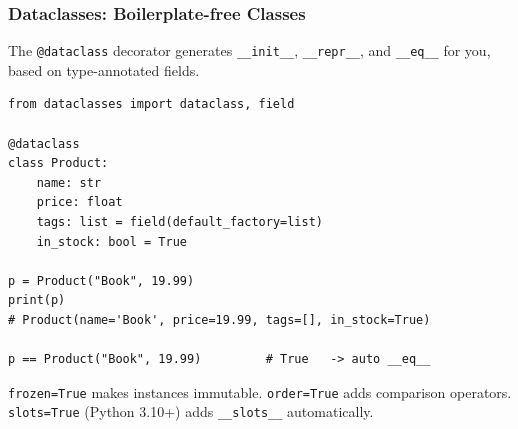 \documentclass[aspectratio=169,10pt]{beamer}
\newcommand{\codeword}[1]{\texttt{#1}}
\newenvironment{bluebox}[1]{%
  \vspace{0.08cm}\begin{tcolorbox}[lecturebox,title={#1},fontupper=\small]%
}{\end{tcolorbox}\vspace{0.05cm}}
\begin{document}
\begin{frame}[fragile]
\frametitle{Dataclasses: Boilerplate-free Classes}
\small
The \codeword{@dataclass} decorator generates \codeword{\_\_init\_\_}, \codeword{\_\_repr\_\_}, and \codeword{\_\_eq\_\_} for you, based on type-annotated fields.

\vspace{0.12cm}
\begin{lstlisting}[style=pycode]
from dataclasses import dataclass, field

@dataclass
class Product:
    name: str
    price: float
    tags: list = field(default_factory=list)
    in_stock: bool = True

p = Product("Book", 19.99)
print(p)
# Product(name='Book', price=19.99, tags=[], in_stock=True)

p == Product("Book", 19.99)         # True   -> auto __eq__
\end{lstlisting}

\begin{bluebox}{Useful flags}
\codeword{frozen=True} makes instances immutable. \codeword{order=True} adds comparison operators. \codeword{slots=True} (Python 3.10+) adds \codeword{\_\_slots\_\_} automatically.
\end{bluebox}
\end{frame}
\end{document}
